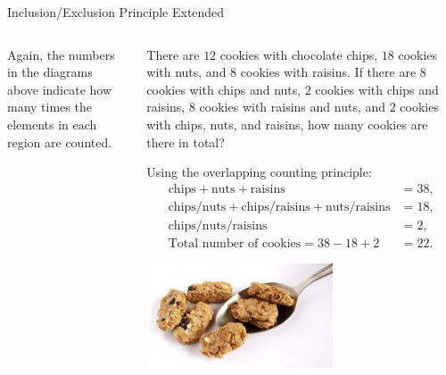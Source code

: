 \documentclass[9pt,aspectratio=169]{beamer}
\begin{document}
\begin{frame}{Inclusion/Exclusion Principle Extended}
\begin{columns}[T]
\begin{column}{0.5\textwidth}
{\begin{columns}[totalwidth=1\textwidth]
\begin{column}{0.33\textwidth}
\begin{center}
          \end{center}
        \end{column}
      \end{columns}
      }
      \vspace*{-0.5\baselineskip}
      Again, the numbers in the diagrams above indicate how many times the elements in each region are counted. 
    \end{column}
    \begin{column}{0.5\textwidth}
      \begin{problem}
        There are $12$ cookies with chocolate chips, $18$ cookies with nuts, and $8$ cookies with raisins.  If there are $8$ cookies with chips and nuts, $2$ cookies with chips and raisins, $8$ cookies with raisins and nuts, and $2$ cookies with chips, nuts, and raisins, how many cookies are there in total?
      \end{problem}
      Using the overlapping counting principle:
      \begin{align*}
        \text{chips} + \text{nuts} + \text{raisins} &= 38, \\
        \text{chips/nuts} + \text{chips/raisins} + \text{nuts/raisins} &= 18, \\
        \text{chips/nuts/raisins} &= 2, \\
        \text{Total number of cookies} = 38 - 18 + 2 &= 22.
      \end{align*}
      \begin{center}
        \vspace*{-\baselineskip}
        \includegraphics[width=0.6\textwidth]{08 - Inclusion Exclusion Principle/cookies.jpg}
      \end{center}
    \end{column}
  \end{columns}
\end{frame}
\end{document}

